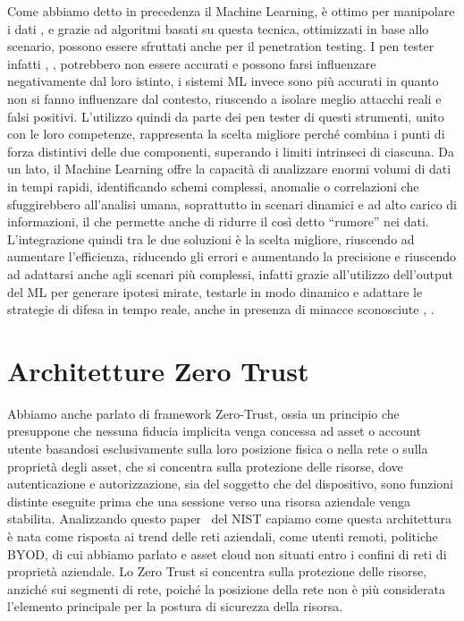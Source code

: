         Come abbiamo detto in precedenza il Machine Learning, è ottimo per manipolare i dati \cite{ai_and_lm}, e grazie ad algoritmi basati su questa tecnica, ottimizzati in base allo scenario, possono essere sfruttati anche per il penetration testing. I pen tester infatti \cite{ml_corrects_human_error}, \cite{the_role_of_humans}, \cite{bias_humans_and_ml} potrebbero non essere accurati e possono farsi influenzare negativamente dal loro istinto, i sistemi ML invece sono più accurati in quanto non si fanno influenzare dal contesto, riuscendo a isolare meglio attacchi reali e falsi positivi. L'utilizzo quindi da parte dei pen tester di questi strumenti, unito con le loro competenze, rappresenta la scelta migliore perché combina i punti di forza distintivi delle due componenti, superando i limiti intrinseci di ciascuna. Da un lato, il Machine Learning offre la capacità di analizzare enormi volumi di dati in tempi rapidi, identificando schemi complessi, anomalie o correlazioni che sfuggirebbero all'analisi umana, soprattutto in scenari dinamici e ad alto carico di informazioni, il che permette anche di ridurre il così detto “rumore” nei dati. L'integrazione quindi tra le due soluzioni è la scelta migliore, riuscendo ad aumentare l'efficienza, riducendo gli errori e aumentando la precisione e riuscendo ad adattarsi anche agli scenari più complessi, infatti grazie all'utilizzo 
        dell'output del ML per generare ipotesi mirate, testarle in modo dinamico e adattare le strategie di difesa in tempo reale, anche in presenza di minacce sconosciute \cite{importance_visualization_ml}, \cite{situational_awarness_ml}.

    \section{Architetture Zero Trust}
        Abbiamo anche parlato di framework Zero-Trust, ossia un principio che presuppone che nessuna fiducia implicita venga concessa ad asset o account utente basandosi esclusivamente sulla loro posizione fisica o nella rete o sulla proprietà degli asset, che si concentra sulla protezione delle risorse, dove autenticazione e autorizzazione, sia del soggetto che del dispositivo, sono funzioni distinte eseguite prima che una sessione verso una risorsa aziendale venga stabilita. Analizzando questo paper~\cite{zero_trust_nist} del NIST capiamo come questa architettura è nata come risposta ai trend delle reti aziendali, come utenti remoti, politiche BYOD, di cui abbiamo parlato e asset cloud non situati entro i confini di reti di proprietà aziendale. Lo Zero Trust si concentra sulla protezione delle risorse, anziché sui segmenti di rete, poiché la posizione della rete non è più considerata l'elemento principale per la postura di sicurezza della risorsa.

